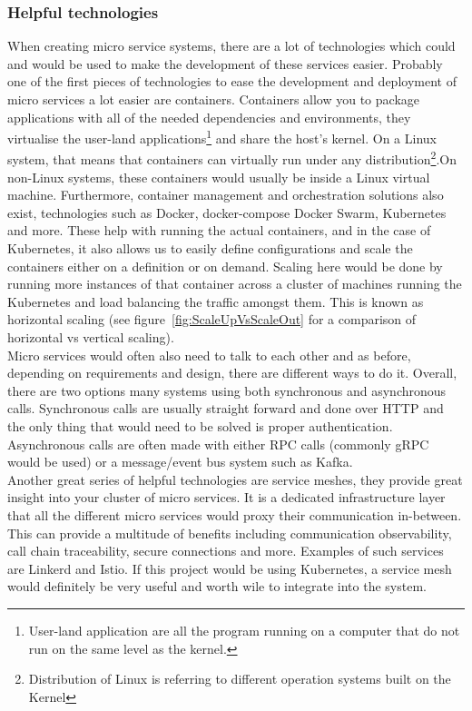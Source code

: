 \documentclass{article}
\newcommand{\vspaceconst}{-2ex}
\begin{document}
\begin{multicols}{2}
\subsubsection{Helpful technologies}
\vspace{\vspaceconst}

  When creating micro service systems, there are a lot of technologies which could and would be used to make the development of these services easier. Probably one of the first pieces of technologies to ease the development and deployment of micro services a lot easier are containers. Containers allow you to package applications with all of the needed dependencies and environments, they virtualise the user-land applications\footnote{User-land application are all the program running on a computer that do not run on the same level as the kernel.} and share the host's kernel. On a Linux system, that means that containers can virtually run under any distribution\footnote{Distribution of Linux is referring to different operation systems built on the Kernel}.On non-Linux systems, these containers would usually be inside a Linux virtual machine. Furthermore, container management and orchestration solutions also exist, technologies such as Docker\cite{Docker}, docker-compose\cite{Docker} Docker Swarm\cite{Docker}, Kubernetes\cite{k8s} and more. These help with running the actual containers, and in the case of Kubernetes, it also allows us to easily define configurations and scale the containers either on a definition or on demand. Scaling here would be done by running more instances of that container across a cluster of machines running the Kubernetes and load balancing the traffic amongst them. This is known as horizontal scaling (see figure~\ref{fig:ScaleUpVsScaleOut} for a comparison of horizontal vs vertical scaling).\\
Micro services would often also need to talk to each other and as before, depending on requirements and design, there are different ways to do it. Overall, there are two options many systems using both synchronous and asynchronous calls. Synchronous calls are usually straight forward and done over HTTP and the only thing that would need to be solved is proper authentication. Asynchronous calls are often made with either RPC calls (commonly gRPC\cite{grpc} would be used) or a message/event bus system such as Kafka\cite{kafka}.\\
Another great series of helpful technologies are service meshes, they provide great insight into your cluster of micro services. It is a dedicated infrastructure layer that all the different micro services would proxy their communication in-between. This can provide a multitude of benefits including communication observability, call chain traceability, secure connections and more. Examples of such services are Linkerd\cite{linkerd} and Istio\cite{istio}. If this project would be using Kubernetes, a service mesh would definitely be very useful and worth wile to integrate into the system.\\


\end{multicols}
\end{document}
